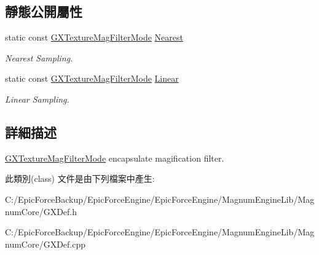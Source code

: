 \subsection*{靜態公開屬性}
\begin{DoxyCompactItemize}
\item 
static const \hyperlink{class_magnum_1_1_g_x_texture_mag_filter_mode}{G\+X\+Texture\+Mag\+Filter\+Mode} \hyperlink{class_magnum_1_1_g_x_texture_mag_filter_mode_a251eb9d49ade29efbf354476ac2abf60}{Nearest}\hypertarget{class_magnum_1_1_g_x_texture_mag_filter_mode_a251eb9d49ade29efbf354476ac2abf60}{}\label{class_magnum_1_1_g_x_texture_mag_filter_mode_a251eb9d49ade29efbf354476ac2abf60}

\begin{DoxyCompactList}\small\item\em Nearest Sampling. \end{DoxyCompactList}\item 
static const \hyperlink{class_magnum_1_1_g_x_texture_mag_filter_mode}{G\+X\+Texture\+Mag\+Filter\+Mode} \hyperlink{class_magnum_1_1_g_x_texture_mag_filter_mode_a1466c160e796a0d2ded7d9a8c57ba251}{Linear}\hypertarget{class_magnum_1_1_g_x_texture_mag_filter_mode_a1466c160e796a0d2ded7d9a8c57ba251}{}\label{class_magnum_1_1_g_x_texture_mag_filter_mode_a1466c160e796a0d2ded7d9a8c57ba251}

\begin{DoxyCompactList}\small\item\em Linear Sampling. \end{DoxyCompactList}\end{DoxyCompactItemize}


\subsection{詳細描述}
\hyperlink{class_magnum_1_1_g_x_texture_mag_filter_mode}{G\+X\+Texture\+Mag\+Filter\+Mode} encapsulate magification filter. 

此類別(class) 文件是由下列檔案中產生\+:\begin{DoxyCompactItemize}
\item 
C\+:/\+Epic\+Force\+Backup/\+Epic\+Force\+Engine/\+Epic\+Force\+Engine/\+Magnum\+Engine\+Lib/\+Magnum\+Core/G\+X\+Def.\+h\item 
C\+:/\+Epic\+Force\+Backup/\+Epic\+Force\+Engine/\+Epic\+Force\+Engine/\+Magnum\+Engine\+Lib/\+Magnum\+Core/G\+X\+Def.\+cpp\end{DoxyCompactItemize}
